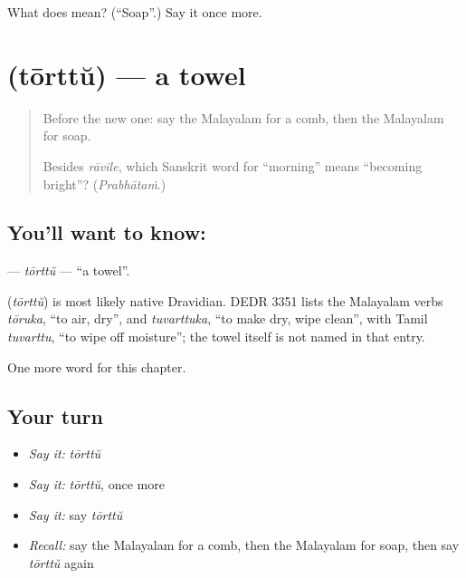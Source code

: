 \begin{tcolorbox}[breakable,colback=teal!4,colframe=teal!35!black,title={Before you move on}]
What does  mean? (\textquotedblleft{}Soap\textquotedblright{}.) Say it once more.
\end{tcolorbox}
\section[\texorpdfstring{\ml{തോർത്ത്} (tōrttŭ)}{തോർത്ത് (tōrttŭ)}]{ (tōrttŭ) — a towel}

\label{lesson:ML-C147-torttu}



\begin{quote}
Before the new one: say the Malayalam for a comb, then the Malayalam for soap.

Besides \emph{rāvile}, which Sanskrit word for \textquotedblleft{}morning\textquotedblright{} means \textquotedblleft{}becoming bright\textquotedblright{}? (\emph{Prabhātaṁ}.)
\end{quote}

\subsection*{You'll want to know: }
\textbf{} — \emph{tōrttŭ} — \textquotedblleft{}a towel\textquotedblright{}.

\begin{cousinweb}
\textbf{} (\emph{tōrttŭ}) is most likely native Dravidian. DEDR 3351 lists the Malayalam verbs \emph{tōruka}, \textquotedblleft{}to air, dry\textquotedblright{}, and \emph{tuvarttuka}, \textquotedblleft{}to make dry, wipe clean\textquotedblright{}, with Tamil \emph{tuvarttu}, \textquotedblleft{}to wipe off moisture\textquotedblright{}; the towel itself is not named in that entry.
\end{cousinweb}

\begin{grammarlens}[title={What you've built}]
One more word for this chapter.
\end{grammarlens}

\subsection*{Your turn}
\begin{itemize}
\raggedright
  \item \emph{Say it:} \emph{tōrttŭ}
  \item \emph{Say it:} \emph{tōrttŭ}, once more
  \item \emph{Say it:} say \emph{tōrttŭ}
  \item \emph{Recall:} say the Malayalam for a comb, then the Malayalam for soap, then say \emph{tōrttŭ} again
\end{itemize}


